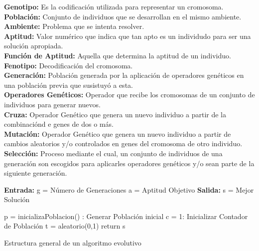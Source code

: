 		\textbf{Genotipo:} Es la codificación utilizada para representar un cromosoma.\\

		\textbf{Población:} Conjunto de individuos que se desarrollan en el mismo ambiente.\\

		\textbf{Ambiente:} Problema que se intenta resolver.\\

		\textbf{Aptitud:} Valor numérico que indica que tan apto es un individudo para ser una solución apropiada.\\

		\textbf{Función de Aptitud:} Aquella que determina la aptitud de un individuo.\\

		\textbf{Fenotipo:} Decodificación del cromosoma.\\

		\textbf{Generación:} Población generada por la aplicación de operadores genéticos en una población previa que susistuyó a esta.\\

		\textbf{Operadores Genéticos:} Operador que recibe los cromosomas de un conjunto de individuos para generar nuevos.\\

		\textbf{Cruza:} Operador Genético que genera un nuevo individuo a partir de la combinaciónd e genes de dos o más.\\

		\textbf{Mutación:} Operador Genético que genera un nuevo individuo a partir de cambios aleatorios y/o controlados en genes del cromosoma de otro individuo.\\

		\textbf{Selección:} Proceso mediante el cual, un conjunto de individuos de una generación son escogidos para aplicarles operadores genéticos y/o sean parte de la siguiente generación. \\
		
		\begin{algorithm}[H]
			\DontPrintSemicolon
			\SetAlgoLined
		\textbf{Entrada:}
		g = Número de Generaciones\;
		a = Aptitud Objetivo\;
		\textbf{Salida:}
		s = Mejor Solución

		p = inicializaPoblacion() : Generar Población inicial\;
		c = 1: Inicializar Contador de Población\;
		t = aleatorio(0,1)\;
		return s\;	
		\caption{Estructura general de un algoritmo evolutivo}
		\end{algorithm}
	
